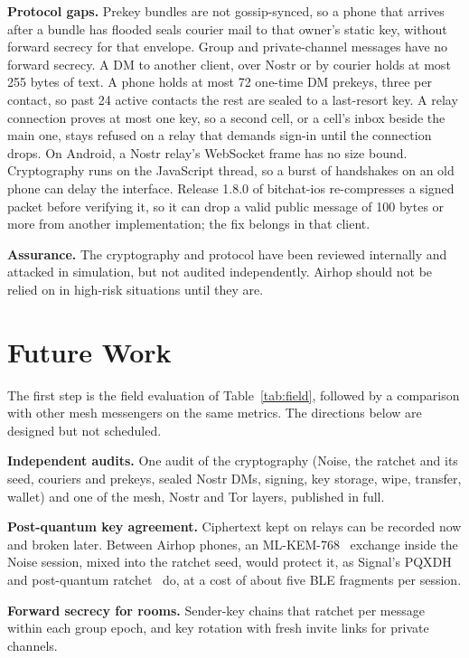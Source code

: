 \documentclass[conference]{IEEEtran}
\begin{document}
\textbf{Protocol gaps.} Prekey bundles are not gossip-synced, so a phone that arrives after a bundle has flooded seals courier mail to that owner's static key, without forward secrecy for that envelope. Group and private-channel messages have no forward secrecy. A DM to another client, over Nostr or by courier holds at most 255 bytes of text. A phone holds at most 72 one-time DM prekeys, three per contact, so past 24 active contacts the rest are sealed to a last-resort key. A relay connection proves at most one key, so a second cell, or a cell's inbox beside the main one, stays refused on a relay that demands sign-in until the connection drops. On Android, a Nostr relay's WebSocket frame has no size bound. Cryptography runs on the JavaScript thread, so a burst of handshakes on an old phone can delay the interface. Release 1.8.0 of bitchat-ios re-compresses a signed packet before verifying it, so it can drop a valid public message of 100 bytes or more from another implementation; the fix belongs in that client.

\textbf{Assurance.} The cryptography and protocol have been reviewed internally and attacked in simulation, but not audited independently. Airhop should not be relied on in high-risk situations until they are.

\section{Future Work}
\label{sec:future}

The first step is the field evaluation of Table~\ref{tab:field}, followed by a comparison with other mesh messengers on the same metrics. The directions below are designed but not scheduled.

\textbf{Independent audits.} One audit of the cryptography (Noise, the ratchet and its seed, couriers and prekeys, sealed Nostr DMs, signing, key storage, wipe, transfer, wallet) and one of the mesh, Nostr and Tor layers, published in full.

\textbf{Post-quantum key agreement.} Ciphertext kept on relays can be recorded now and broken later. Between Airhop phones, an ML-KEM-768~\cite{fips203} exchange inside the Noise session, mixed into the ratchet seed, would protect it, as Signal's PQXDH~\cite{pqxdh} and post-quantum ratchet~\cite{spqr} do, at a cost of about five BLE fragments per session.

\textbf{Forward secrecy for rooms.} Sender-key chains that ratchet per message within each group epoch, and key rotation with fresh invite links for private channels.
\end{document}
